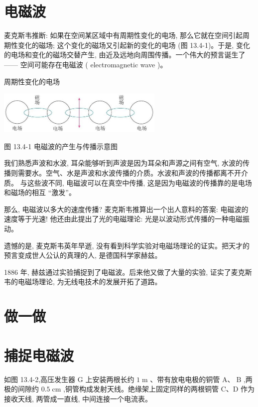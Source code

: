 \documentclass[10pt]{article}
\begin{document}
\section*{电磁波}

麦克斯韦推断: 如果在空间某区域中有周期性变化的电场, 那么它就在空间引起周期性变化的磁场; 这个变化的磁场又引起新的变化的电场 (图 13.4-1)。于是, 变化的电场和变化的磁场交替产生, 由近及远地向周围传播。一个伟大的预言诞生了—— 空间可能存在电磁波 ( electromagnetic wave )。

周期性变化的电场

\begin{center}
\includegraphics[max width=0.6\textwidth]{images/01911d5f-8e38-70c0-b5b8-2b399bd115b6_125_221529.jpg}
\end{center}

图 13.4-1 电磁波的产生与传播示意图

我们熟悉声波和水波, 耳朵能够听到声波是因为耳朵和声源之间有空气, 水波的传播则需要水。空气、水是声波和水波传播的介质。水波和声波的传播都离不开介质。 与这些波不同, 电磁波可以在真空中传播, 这是因为电磁波的传播靠的是电场和磁场的相互 “激发”。

那么, 电磁波以多大的速度传播? 麦克斯韦推算出一个出人意料的答案: 电磁波的速度等于光速! 他还由此提出了光的电磁理论: 光是以波动形式传播的一种电磁振动。

遗憾的是, 麦克斯韦英年早逝, 没有看到科学实验对电磁场理论的证实。把天才的预言变成世人公认的真理的人, 是德国科学家赫兹。

1886 年, 赫兹通过实验捕捉到了电磁波。后来他又做了大量的实验, 证实了麦克斯韦的电磁场理论, 为无线电技术的发展开拓了道路。

\section*{做一做}

\section*{捕捉电磁波}

如图 13.4-2,高压发生器 \(\mathrm{G}\) 上安装两根长约 \(1\mathrm{\;m}\) 、带有放电电极的铜管 \(\mathrm{A}\text{、}\mathrm{\;B}\) ,两极的间隙约 \({0.5}\mathrm{\;{cm}}\) ,铜管构成发射天线。绝缘架上固定同样的两根铜管 C、D 作为接收天线, 两管成一直线, 中间连接一个电流表。
\end{document}

